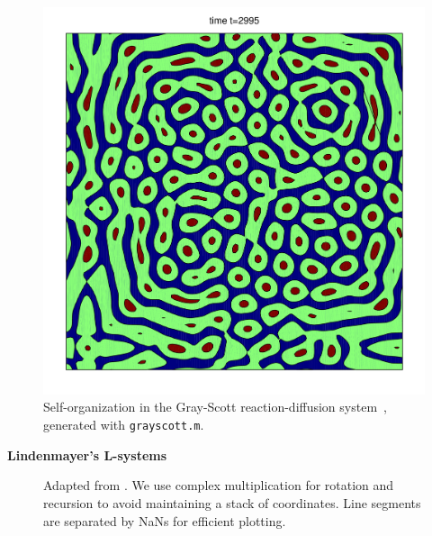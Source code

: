 \documentclass{beamer}
\def\sect#1{\textbf{\color{blue} #1}}
\begin{document}
\begin{frame}[t]{}
\begin{multicols}{5}
\begin{figure}
\end{figure}
\begin{figure}
\includegraphics[width=0.75\hsize]{grayscott.png}
\caption{Self-organization in the Gray-Scott reaction-diffusion system~\cite{pearson}, generated with \texttt{grayscott.m}.}
\end{figure}

\medskip

\sect{Lindenmayer's L-systems}


\begin{figure}
\caption{Adapted from \cite{matlabguide}. We use complex multiplication for 
rotation and recursion to avoid maintaining a stack of coordinates. 
Line segments are separated by NaNs for efficient plotting.}
\end{figure}


\end{multicols}
\end{frame}
\end{document}
